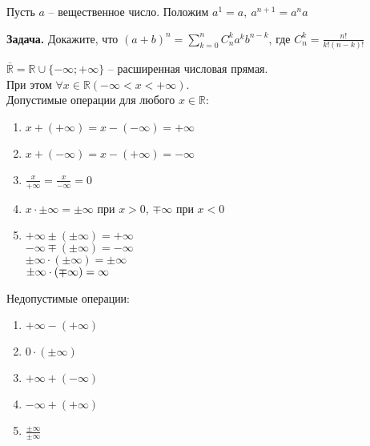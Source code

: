     \begin{definition}
        Пусть $a$ -- вещественное число. Положим $a^{1} = a, \ a^{n+1} = a^{n}a$
    \end{definition}
    
    \textbf{Задача.} Докажите, что $(a + b)^{n} = \sum\limits_{k=0}^n C^{k}_{n}a^{k}b^{n - k}$, где $C^{k}_{n} = \frac{n!}{k!(n - k)!}$
    
    \begin{definition}
        $\overline{\mathds{R}} = \mathds{R} \cup \{-\infty;+\infty\}$ -- расширенная числовая прямая.
        \\
        При этом $\forall x \in \mathds{R} (-\infty < x < +\infty)$.
        \\
        Допустимые операции для любого $x \in \mathds{R}$:
        
        \begin{enumerate}
            \item $x + (+\infty) = x - (-\infty) = +\infty$
            \item $x + (-\infty) = x - (+\infty) = -\infty$
            \item $\frac{x}{+\infty} = \frac{x}{-\infty} = 0$
            \item $x \cdot \pm \infty = \pm \infty$ при $x > 0$, $\mp \infty$ при $x < 0$
            \item $+\infty \pm (\pm \infty) = +\infty$
            \\
            $-\infty \mp (\pm \infty) = -\infty$
            \\
            $\pm \infty \cdot (\pm \infty) = \pm \infty$
            \\
            $\pm \infty \cdot (\mp \infty) = \- \infty$
        \end{enumerate}
        
        Недопустимые операции:
        
        \begin{enumerate}
            \item $+ \infty - (+ \infty)$
            \item $0 \cdot (\pm \infty)$
            \item $+ \infty + (- \infty)$
            \item $- \infty + (+ \infty)$
            \item $\frac{\pm \infty}{\pm \infty}$
        \end{enumerate}
    \end{definition}
    
